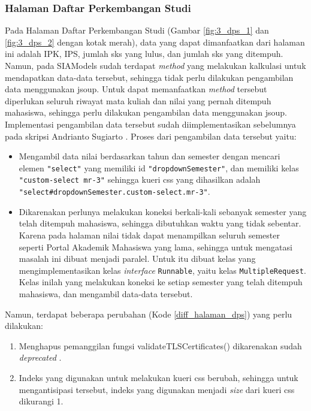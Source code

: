 \subsubsection{Halaman Daftar Perkembangan Studi}
Pada Halaman Daftar Perkembangan Studi (Gambar \ref{fig:3_dps_1} dan \ref{fig:3_dps_2} dengan kotak merah), data yang dapat dimanfaatkan dari halaman ini adalah IPK, IPS, jumlah sks yang lulus, dan jumlah sks yang ditempuh. Namun, pada SIAModels sudah terdapat \textit{method} yang melakukan kalkulasi untuk mendapatkan data-data tersebut, sehingga tidak perlu dilakukan pengambilan data menggunakan jsoup. Untuk dapat memanfaatkan \textit{method} tersebut diperlukan seluruh riwayat mata kuliah dan nilai yang pernah ditempuh mahasiswa, sehingga perlu dilakukan pengambilan data menggunakan jsoup.  Implementasi pengambilan data tersebut sudah diimplementasikan sebelumnya pada skripsi Andrianto Sugiarto \cite{ifstupor}. Proses dari pengambilan data tersebut yaitu:
    \begin{itemize}
        \item Mengambil data nilai berdasarkan tahun dan semester dengan mencari elemen \texttt{"select"} yang memiliki id \texttt{"dropdownSemester"}, dan memiliki kelas \texttt{"custom-select mr-3"} sehingga kueri css yang dihasilkan adalah \texttt{"select\#dropdownSemester.custom-select.mr-3"}.
        \label{multipleRequest}
        \item Dikarenakan perlunya melakukan koneksi berkali-kali sebanyak semester yang telah ditempuh mahasiswa, sehingga dibutuhkan waktu yang tidak sebentar. Karena pada halaman nilai tidak dapat menampilkan seluruh semester seperti Portal Akademik Mahasiswa yang lama, sehingga untuk mengatasi masalah ini dibuat menjadi paralel. Untuk itu dibuat kelas yang mengimplementasikan kelas \textit{interface} \texttt{Runnable}, yaitu kelas \texttt{MultipleRequest}. Kelas inilah yang melakukan koneksi ke setiap semester yang telah ditempuh mahasiswa, dan mengambil data-data tersebut.
    \end{itemize}
    Namun, terdapat beberapa perubahan (Kode \ref{diff_halaman_dps}) yang perlu dilakukan:
    \begin{enumerate}
        \item Menghapus pemanggilan fungsi validateTLSCertificates() dikarenakan sudah \textit{deprecated} \cite{jsoup}.
        \item Indeks yang digunakan untuk melakukan kueri css berubah, sehingga untuk mengantisipasi tersebut, indeks yang digunakan menjadi \textit{size} dari kueri css dikurangi 1.
    \end{enumerate}
        
